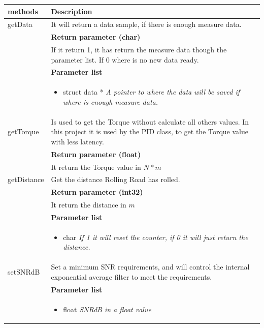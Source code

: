 \begin{table}[H]
	\centering
	\begin{tabular}{|p{5 cm}|p{10 cm}|}
		\hline
		\textbf{methods} & \textbf{Description} \\ \hline
		
		getData
		& It will return a data sample, if there is enough measure data. 
		\\ & \textbf{Return parameter (char)}
		\\ & If it return 1, it has return the measure data though the parameter list. If 0 where is no new data ready.
		\\ & \textbf{Parameter list}
		\\ & \begin{itemize}
			\item {\large struct data *}
			\subitem \textit{A pointer to where the data will be saved if where is enough measure data.}
		\end{itemize}
		\\ \hline
		
		getTorque \fxnote{klasse diagram passer ikke sammen med klassebeskrivelse}
		& Is used to get the Torque without calculate all others values. In this project it is used by the PID class, to get the Torque value with less latency.
		\\ & \textbf{Return parameter (float)}
		\\ & It return the Torque value in $ N*m $ 
		\\ \hline
		
		getDistance
		& Get the distance Rolling Road has rolled. 
		\\ & \textbf{Return parameter (int32)}
		\\ & It return the distance in $ m $
		\\ & \textbf{Parameter list}
		\\ & \begin{itemize}
			\item {\large char}
			\subitem \textit{If 1 it will reset the counter, if 0 it will just return the distance.}
		\end{itemize}
		\\ \hline
		
			setSNRdB
			& Set a minimum SNR requirements, and will control the internal exponential average filter to meet the requirements.  
			\\ & \textbf{Parameter list}
			\\ & \begin{itemize}
				\item {\large float}
				\subitem \textit{SNRdB in a float value}
			\end{itemize}
			\\ \hline
			

\end{tabular}
\end{table}
